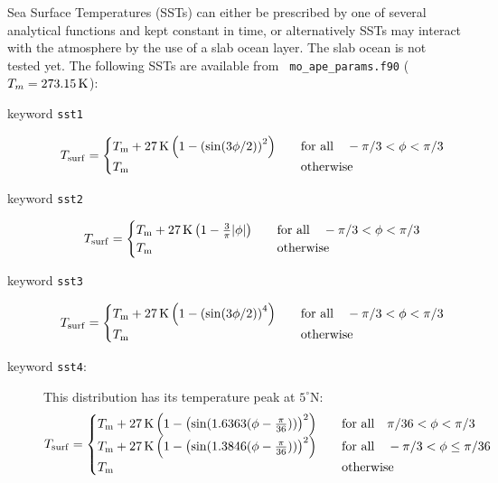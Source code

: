 Sea Surface Temperatures (SSTs) can either be prescribed by one of
several analytical functions and kept constant in time, or alternatively SSTs
may interact with the atmosphere by the use of a slab ocean layer. The 
slab ocean is not tested yet.
The following SSTs are available from {\tt
  mo\_ape\_params.f90} ($T_m=273.15\,{\rm K}$): 
\begin{description}
\item[keyword {\tt sst1}]
\begin{equation}
T_{\rm surf}=
\begin{cases}
T_{\rm m} + 27\,{\rm K} \left(1-\left(\sin(3\phi/2)\right)^2\right)
&\quad \text{for all} \quad -\pi/3<\phi<\pi/3\\
T_{\rm m} &\quad \text{otherwise}
\end{cases}
\end{equation}
\item[keyword {\tt sst2}]
\begin{equation}
T_{\rm surf}=
\begin{cases}
T_{\rm m} + 27\,{\rm K} \left(1-\frac{3}{\pi}|\phi|\right)
&\quad \text{for all} \quad -\pi/3<\phi<\pi/3\\
T_{\rm m} &\quad \text{otherwise}
\end{cases}
\end{equation}
\item[keyword {\tt sst3}]
\begin{equation}
T_{\rm surf}=
\begin{cases}
T_{\rm m} + 27\,{\rm K} \left(1-\left(\sin(3\phi/2)\right)^4\right)
&\quad \text{for all} \quad -\pi/3<\phi<\pi/3\\
T_{\rm m} &\quad \text{otherwise}
\end{cases}
\end{equation}
\item[keyword {\tt sst4}:]
This distribution has its temperature peak at $5^\circ$N:
\begin{equation}
T_{\rm surf}=
\begin{cases}
T_{\rm m} + 27\,{\rm K} \left(1-\left(\sin(1.6363(\phi-\frac{\pi}{36}))\right)^2\right)
&\quad \text{for all} \quad \pi/36<\phi<\pi/3\\
T_{\rm m} + 27\,{\rm K} \left(1-\left(\sin(1.3846(\phi-\frac{\pi}{36}))\right)^2\right)
&\quad \text{for all} \quad -\pi/3<\phi\le\pi/36\\
T_{\rm m} &\quad \text{otherwise}
\end{cases}
\end{equation}

\end{description}
